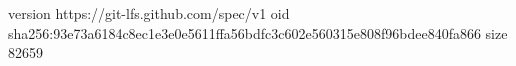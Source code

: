 version https://git-lfs.github.com/spec/v1
oid sha256:93e73a6184c8ec1e3e0e5611ffa56bdfc3c602e560315e808f96bdee840fa866
size 82659
